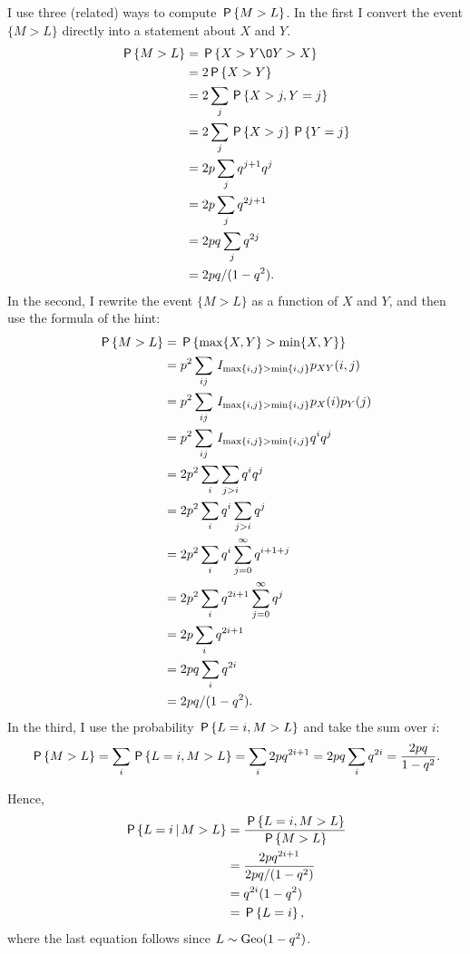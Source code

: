 \documentclass[a4paper,12pt]{article}
\begin{document}
\begin{exercise}
\begin{solution}
I use three (related) ways to compute $\P{M>L}$. In the first I convert the event $\{M>L\}$ directly into a statement about $X$ and $Y$.
\begin{align}
  \label{eq:3}
\P{M>L} 
&= \P{X>Y \O Y > X} \\
&= 2\P{X>Y} \\
&= 2\sum_{j} \P{X>j,Y=j} \\
&= 2\sum_{j}  \P{X>j}\P{Y=j} \\
&= 2p\sum_{j} q^{j+1} q^j\\
&= 2p\sum_{j} q^{2j+1}\\
&= 2pq\sum_{j} q^{2j}\\
&= 2pq/(1-q^2).
\end{align}
In the second,  I rewrite the event $\{M>L\}$ as a function of $X$ and $Y$, and then use  the formula of the hint:
\begin{align}
  \label{eq:4}
\P{M>L}  &= \P{\max{X, Y} > \min{X,Y}} \\
&=p^2\sum_{ij}\1{\max{i, j} > \min{i, j}} p_{XY}(i,j) \\
&=p^2\sum_{ij}\1{\max{i, j} > \min{i, j}} p_{X}(i)p_{Y}(j) \\
&=p^2\sum_{ij}\1{\max{i, j} > \min{i, j}} q^i q^j \\
&=2p^2\sum_{i}\sum_{j>i} q^i q^j \\
&=2p^2\sum_{i}q^i \sum_{j>i} q^j \\
&=2p^2\sum_{i}q^i \sum_{j=0}^\infty q^{i+1+j} \\
&=2p^2\sum_{i}q^{2i+1} \sum_{j=0}^\infty q^{j} \\
&=2p\sum_{i}q^{2i+1} \\
&=2pq\sum_{i}q^{2i} \\
&=2pq/(1-q^2).
\end{align}
In the third, I use the probability $\P{L=i, M>L}$ and take the sum over $i$:
\begin{align}
  \label{eq:48}
\P{M>L} = \sum_{i} \P{L=i, M>L}  = \sum_{i} 2pq^{2i+1} = 2pq\sum_{i} q^{2i} = \frac{2pq}{1-q^{2}}.
\end{align}

Hence, 
\begin{align}
\P{L=i\given M > L} 
&=\frac{\P{L=i, M > L}}{\P{M>L}} \\
&=\frac{2p q^{2i+1}}{2pq/(1-q^2)} \\
&=q^{2i}(1-q^2) \\
&= \P{L=i},
\end{align}
where the last equation follows since $L\sim \Geo{1-q^2}$.

\end{solution}
\end{exercise}
\end{document}
